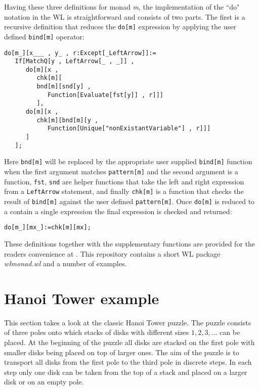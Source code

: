 \documentclass[smallextended]{svjour3}
\begin{document}
Having these three definitions for monad \emph{m}, the implementation of the
``do" notation in the WL is straightforward and consists of two parts. 
The first is a recursive definition that reduces the \verb|do[m]| expression
by applying the user defined \verb|bind[m]| operator:
\begin{lstlisting}
do[m_][x___ , y_ , r:Except[_LeftArrow]]:= 
   If[MatchQ[y , LeftArrow[_ , _]] , 
      do[m][x , 
         chk[m][
         bnd[m][snd[y] , 
            Function[Evaluate[fst[y]] , r]]]
         ],
      do[m][x , 
         chk[m][bnd[m][y , 
            Function[Unique["nonExistantVariable"] , r]]]
      ]
   ];
\end{lstlisting}
Here \verb|bnd[m]| will be replaced by the appropriate user supplied
\verb|bind[m]|
function when the first argument matches \verb|pattern[m]| and the second
argument is a function, \verb|fst|, \verb|snd| are helper functions that take the left and
right expression from a \verb|LeftArrow| statement, and finally \verb|chk[m]|
is a function that checks the result of \verb|bind[m]| against the user defined 
\verb|pattern[m]|. Once \verb|do[m]| is reduced to a contain a single expression 
the final expression is checked and returned:
\begin{lstlisting}
do[m_][mx_]:=chk[m][mx];
\end{lstlisting}
These definitions together with the supplementary functions are provided
for the readers convenience at \cite{repos}. This repository contains a 
short WL package \emph{wlmonad.wl} and a number of examples. 

\section{Hanoi Tower example}
\label{examples}

This section takes a look  
at the classic Hanoi Tower puzzle.
The puzzle
consists of three poles onto which stacks of disks with different sizes $1 , 2 , 3 , \ldots$
can be placed. At the beginning of the puzzle all disks are stacked on the first pole
with smaller disks being placed on top of larger ones. The aim of the puzzle is to 
transport all disks from the first pole to the third pole in discrete steps. In each 
step only one disk can be taken from the top of a stack and placed on a larger disk
or on an empty pole.
\end{document}
